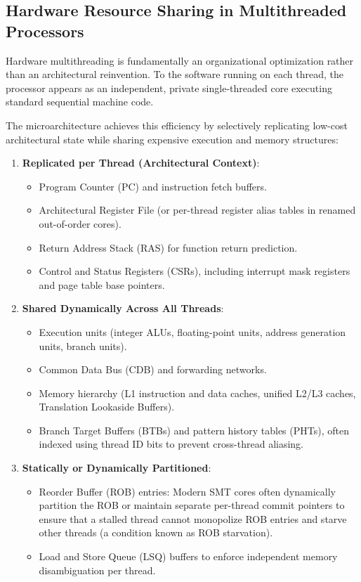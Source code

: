 \subsection{Hardware Resource Sharing in Multithreaded Processors}

Hardware multithreading is fundamentally an organizational optimization rather than an architectural reinvention. To the software running on each thread, the processor appears as an independent, private single-threaded core executing standard sequential machine code. 

The microarchitecture achieves this efficiency by selectively replicating low-cost architectural state while sharing expensive execution and memory structures:
\begin{enumerate}
    \item \textbf{Replicated per Thread (Architectural Context)}:
    \begin{itemize}
        \item Program Counter (PC) and instruction fetch buffers.
        \item Architectural Register File (or per-thread register alias tables in renamed out-of-order cores).
        \item Return Address Stack (RAS) for function return prediction.
        \item Control and Status Registers (CSRs), including interrupt mask registers and page table base pointers.
    \end{itemize}
    \item \textbf{Shared Dynamically Across All Threads}:
    \begin{itemize}
        \item Execution units (integer ALUs, floating-point units, address generation units, branch units).
        \item Common Data Bus (CDB) and forwarding networks.
        \item Memory hierarchy (L1 instruction and data caches, unified L2/L3 caches, Translation Lookaside Buffers).
        \item Branch Target Buffers (BTBs) and pattern history tables (PHTs), often indexed using thread ID bits to prevent cross-thread aliasing.
    \end{itemize}
    \item \textbf{Statically or Dynamically Partitioned}:
    \begin{itemize}
        \item Reorder Buffer (ROB) entries: Modern SMT cores often dynamically partition the ROB or maintain separate per-thread commit pointers to ensure that a stalled thread cannot monopolize ROB entries and starve other threads (a condition known as ROB starvation).
        \item Load and Store Queue (LSQ) buffers to enforce independent memory disambiguation per thread.
    \end{itemize}
\end{enumerate}


